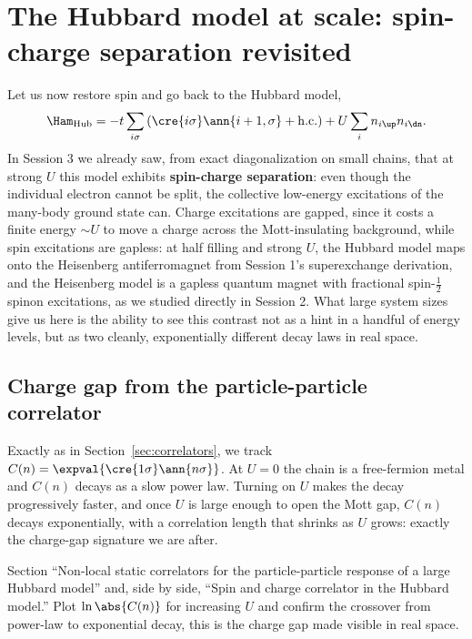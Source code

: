 \documentclass[all_sessions.tex]{subfiles}
\begin{document}
\section{The Hubbard model at scale: spin-charge separation revisited}
\label{sec:hubbard}
Let us now restore spin and go back to the Hubbard model,
\begin{equation}
  \Ham_{\mathrm{Hub}} = -t\sum_{i\sigma}\left(\cre{i\sigma}\ann{i+1,\sigma}+\mathrm{h.c.}\right)
    + U\sum_i n_{i\up}n_{i\dn}.
\end{equation}
In Session 3 we already saw, from exact diagonalization on small chains, that at strong $U$ this
model exhibits \textbf{spin-charge separation}: even though the individual electron cannot be split,
the collective low-energy excitations of the many-body ground state can. Charge excitations are
gapped, since it costs a finite energy $\sim U$ to move a charge across the Mott-insulating
background, while spin excitations are gapless: at half filling and strong $U$, the Hubbard model
maps onto the Heisenberg antiferromagnet from Session 1's superexchange derivation, and the
Heisenberg model is a gapless quantum magnet with fractional spin-$\tfrac12$ spinon excitations, as
we studied directly in Session 2. What large system sizes give us here is the ability to see this
contrast not as a hint in a handful of energy levels, but as two cleanly, exponentially different
decay laws in real space.

\subsection{Charge gap from the particle-particle correlator}
Exactly as in Section~\ref{sec:correlators}, we track $C(n) = \expval{\cre{1\sigma}\ann{n\sigma}}$.
At $U=0$ the chain is a free-fermion metal and $C(n)$ decays as a slow power law. Turning on $U$
makes the decay progressively faster, and once $U$ is large enough to open the Mott gap, $C(n)$
decays exponentially, with a correlation length that shrinks as $U$ grows: exactly the charge-gap
signature we are after.

\begin{notebook}
Section ``Non-local static correlators for the particle-particle response of a large Hubbard
model'' and, side by side, ``Spin and charge correlator in the Hubbard model.'' Plot
$\ln\abs{C(n)}$ for increasing $U$ and confirm the crossover from power-law to exponential decay,
this is the charge gap made visible in real space.
\end{notebook}
\end{document}
